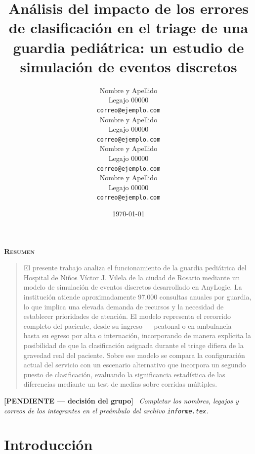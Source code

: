 \documentclass{article}
\title{Análisis del impacto de los errores de clasificación en el triage
  de una guardia pediátrica: un estudio de simulación de eventos discretos}
\author{
  Nombre y Apellido \\
  Legajo 00000 \\
  \texttt{correo@ejemplo.com} \\
  \And
  Nombre y Apellido \\
  Legajo 00000 \\
  \texttt{correo@ejemplo.com} \\
  \AND
  Nombre y Apellido \\
  Legajo 00000 \\
  \texttt{correo@ejemplo.com} \\
  \And
  Nombre y Apellido \\
  Legajo 00000 \\
  \texttt{correo@ejemplo.com} \\
}
\date{\today}
\renewenvironment{abstract}
  {\centerline{\large \bfseries \scshape Resumen}\begin{quote}}
  {\end{quote}}
\newenvironment{pendiente}
  {\par\medskip\noindent\begingroup\color{red!65!black}%
   \textbf{[PENDIENTE — decisión del grupo]}\ \itshape}
  {\endgroup\par\medskip}
\begin{document}
\renewcommand{\contentsname}{Índice}
\renewcommand{\refname}{Bibliografía}
\renewcommand{\tablename}{Tabla}
\renewcommand{\figurename}{Figura}
\renewcommand{\lstlistingname}{Código}
\makeatletter
\def\keywordname{{\bfseries \emph{Palabras clave}}}
\makeatother

\maketitle

\begin{abstract}
El presente trabajo analiza el funcionamiento de la guardia pediátrica del
Hospital de Niños Víctor J. Vilela de la ciudad de Rosario mediante un modelo
de simulación de eventos discretos desarrollado en AnyLogic. La institución
atiende aproximadamente 97.000 consultas anuales por guardia, lo que implica
una elevada demanda de recursos y la necesidad de establecer prioridades de
atención. El modelo representa el recorrido completo del paciente, desde su
ingreso --- peatonal o en ambulancia --- hasta su egreso por alta o
internación, incorporando de manera explícita la posibilidad de que la
clasificación asignada durante el triage difiera de la gravedad real del
paciente. Sobre ese modelo se compara la configuración actual del servicio
con un escenario alternativo que incorpora un segundo puesto de
clasificación, evaluando la significancia estadística de las diferencias
mediante un test de medias sobre corridas múltiples.
\end{abstract}


\begin{pendiente}
Completar los nombres, legajos y correos de los integrantes en el preámbulo
del archivo \texttt{informe.tex}.
\end{pendiente}

\newpage
\tableofcontents
\newpage

\section*{Introducción}
\end{document}
